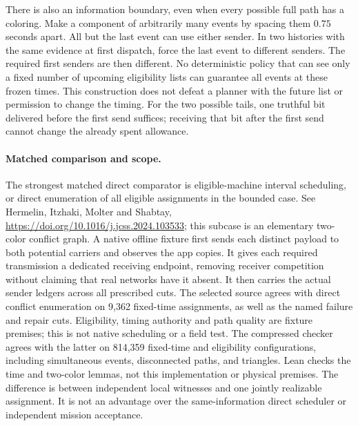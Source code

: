 \documentclass[11pt]{article}
\begin{document}
There is also an information boundary, even when every possible
full path has a coloring. Make a component of arbitrarily many
events by spacing them $0.75$ seconds apart. All but the last event
can use either sender. In two histories with the same evidence at
first dispatch, force the last event to different senders. The
required first senders are then different. No deterministic policy
that can see only a fixed number of upcoming eligibility lists
can guarantee all events at these frozen times. This construction
does not defeat a planner with the future list or permission to change
the timing. For the two possible tails, one truthful bit delivered
before the first send suffices; receiving that bit after the first
send cannot change the already spent allowance.

\paragraph{Matched comparison and scope.}
The strongest matched direct comparator is eligible-machine interval
scheduling, or direct enumeration of all eligible assignments
in the bounded case. See Hermelin, Itzhaki, Molter and Shabtay,
\url{https://doi.org/10.1016/j.jcss.2024.103533}; this subcase is
an elementary two-color conflict graph. A native offline fixture first sends each distinct payload to both potential
carriers and observes the app copies. It gives each required transmission a
dedicated receiving endpoint, removing receiver competition without claiming
that real networks have it absent. It then carries the actual sender ledgers
across all prescribed cuts. The selected source agrees with direct conflict
enumeration on 9,362 fixed-time assignments, as well as the named failure and
repair cuts. Eligibility, timing authority and path quality are fixture
premises; this is not native scheduling or a field test.
The compressed checker agrees
with the latter on 814,359 fixed-time and eligibility configurations,
including simultaneous events, disconnected paths, and triangles.
Lean checks the time and two-color lemmas, not this implementation
or physical premises. The difference is between independent local
witnesses and one jointly realizable assignment. It is not an
advantage over the same-information direct scheduler or independent
mission acceptance.
\end{document}
